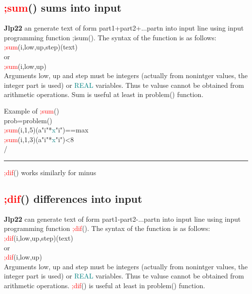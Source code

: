 \subsection{\textcolor{Red}{;sum}() sums into input} 
\label{inpusum} 
\textbf{Jlp22} an generate text of form part1+part2+...partn into input line using 
input programming function ;isum(). The syntax of the function is as follows:\\ 
\textcolor{Red}{;sum}(i,low,up,step)(text)\\ 
or \\ 
\textcolor{Red}{;sum}(i,low,up)\\ 
Arguments low, up and step must be integers (actually from nonintger values, the 
integer part is used) or \textcolor{teal}{REAL} variables. Thus te valuse cannot be obtained 
from arithmetic operations. Sum is useful at least in \textcolor{VioletRed}{problem}() function. 
\singlespacing 
\begin{example}[inpusumex]Example of \textcolor{Red}{;sum}()\\ 
\label{inpusumex} 
\noindent prob=\textcolor{VioletRed}{problem}()\\ 
\textcolor{Red}{;sum}(i,1,5)(a"i"*\textcolor{teal}{x}"i")==max\\ 
\textcolor{Red}{;sum}(i,1,3)(a"i"*\textcolor{teal}{x}"i")<8\\ 
/                                                          \\ 
\end{example} 
\vspace{-7mm} \rule{5cm}{0.1pt} 
\onehalfspacing 
\begin{note} 
\textcolor{Red}{;dif}() works similarly for minus 
\end{note} 
\subsection{\textcolor{Red}{;dif}() differences into input} 
\label{inpudif} 
\textbf{Jlp22} can generate text of form part1-part2-...partn into input line using 
input programming function \textcolor{Red}{;dif}(). The syntax of the function is as follows:\\ 
\textcolor{Red}{;dif}(i,low,up,step)(text)\\ 
or \\ 
\textcolor{Red}{;dif}(i,low,up)\\ 
Arguments low, up and step must be integers (actually from nonintger values, the 
integer part is used) or \textcolor{teal}{REAL} variables. Thus te valuse cannot be obtained 
from arithmetic operations. \textcolor{Red}{;dif}() is useful at least in \textcolor{VioletRed}{problem}() function. 
 
